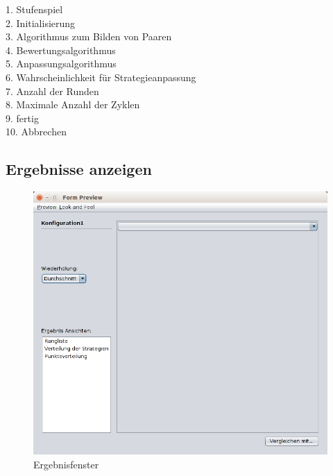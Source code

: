 \begin{description}

\item[1. Stufenspiel] 

\item[2. Initialisierung] 

\item[3. Algorithmus zum Bilden von Paaren] 

\item[4. Bewertungsalgorithmus] 

\item[5. Anpassungsalgorithmus] 

\item[6. Wahrscheinlichkeit für Strategieanpassung] 

\item[7. Anzahl der Runden] 

\item[8. Maximale Anzahl der Zyklen] 

\item[9. fertig] 

\item[10. Abbrechen]


\end{description}

\pagebreak


\subsection{Ergebnisse anzeigen}

\begin{figure}[hp] 
  \centering
     \includegraphics[width=1.1\textwidth]{GUI_Entwurf/Ergebnisfenster(1).png}
  \caption{Ergebnisfenster}
  \label{fig:Bild7}
\end{figure}

